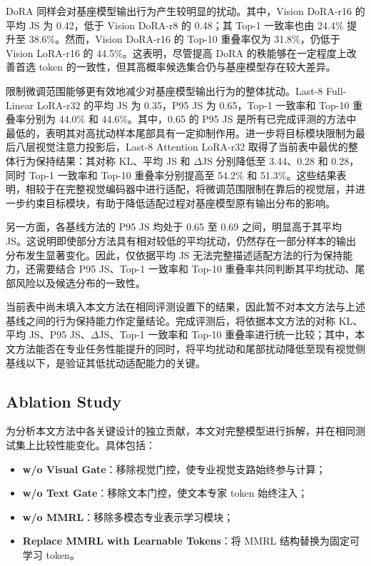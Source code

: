 \documentclass[journal]{IEEEtran}
\begin{document}
DoRA 同样会对基座模型输出行为产生较明显的扰动。其中，Vision DoRA-r16 的平均 JS 为 0.42，低于 Vision DoRA-r8 的 0.48；其 Top-1 一致率也由 24.4\% 提升至 38.6\%。然而，Vision DoRA-r16 的 Top-10 重叠率仅为 31.8\%，仍低于 Vision LoRA-r16 的 44.5\%。这表明，尽管提高 DoRA 的秩能够在一定程度上改善首选 token 的一致性，但其高概率候选集合仍与基座模型存在较大差异。

限制微调范围能够更有效地减少对基座模型输出行为的整体扰动。Last-8 Full-Linear LoRA-r32 的平均 JS 为 0.35，P95 JS 为 0.65，Top-1 一致率和 Top-10 重叠率分别为 44.0\% 和 44.6\%。其中，0.65 的 P95 JS 是所有已完成评测的方法中最低的，表明其对高扰动样本尾部具有一定抑制作用。进一步将目标模块限制为最后八层视觉注意力投影后，Last-8 Attention LoRA-r32 取得了当前表中最优的整体行为保持结果：其对称 KL、平均 JS 和 $\Delta$JS 分别降低至 3.44、0.28 和 0.28，同时 Top-1 一致率和 Top-10 重叠率分别提高至 54.2\% 和 51.3\%。这些结果表明，相较于在完整视觉编码器中进行适配，将微调范围限制在靠后的视觉层，并进一步约束目标模块，有助于降低适配过程对基座模型原有输出分布的影响。

另一方面，各基线方法的 P95 JS 均处于 0.65 至 0.69 之间，明显高于其平均 JS。这说明即使部分方法具有相对较低的平均扰动，仍然存在一部分样本的输出分布发生显著变化。因此，仅依据平均 JS 无法完整描述适配方法的行为保持能力，还需要结合 P95 JS、Top-1 一致率和 Top-10 重叠率共同判断其平均扰动、尾部风险以及候选分布的一致性。

当前表中尚未填入本文方法在相同评测设置下的结果，因此暂不对本文方法与上述基线之间的行为保持能力作定量结论。完成评测后，将依据本文方法的对称 KL、平均 JS、P95 JS、$\Delta$JS、Top-1 一致率和 Top-10 重叠率进行统一比较；其中，本文方法能否在专业任务性能提升的同时，将平均扰动和尾部扰动降低至现有视觉侧基线以下，是验证其低扰动适配能力的关键。


\subsection{Ablation Study}

为分析本文方法中各关键设计的独立贡献，本文对完整模型进行拆解，并在相同测试集上比较性能变化。具体包括：
\begin{itemize}
    \item \textbf{w/o Visual Gate}：移除视觉门控，使专业视觉支路始终参与计算；
    \item \textbf{w/o Text Gate}：移除文本门控，使文本专家 token 始终注入；
    \item \textbf{w/o MMRL}：移除多模态专业表示学习模块；
    \item \textbf{Replace MMRL with Learnable Tokens}：将 MMRL 结构替换为固定可学习 token。
\end{itemize}
\end{document}
